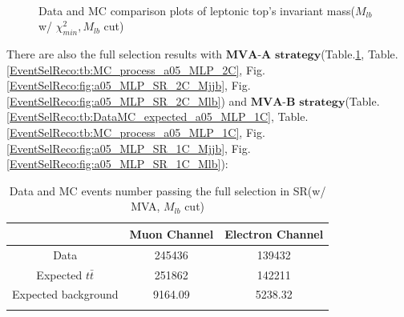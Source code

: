 		\begin{figure}[H]
		\centering
			\\
		\caption{Data and MC comparison plots of leptonic top's invariant mass($M_{lb}$ w/ $\chi^2_{min}, M_{lb}$ cut)}
		\label{EventSelReco:fig:chi2_SR_2C_Mlb}
		\end{figure}
		\FloatBarrier

		There are also the full selection results with $\textbf{MVA-A strategy}$(Table.\ref{EventSelReco:tb:DataMC_expected_a05_MLP_2C}, Table.\ref{EventSelReco:tb:MC_process_a05_MLP_2C}, Fig.\ref{EventSelReco:fig:a05_MLP_SR_2C_Mjjb}, Fig.\ref{EventSelReco:fig:a05_MLP_SR_2C_Mlb}) and $\textbf{MVA-B strategy}$(Table.\ref{EventSelReco:tb:DataMC_expected_a05_MLP_1C}, Table.\ref{EventSelReco:tb:MC_process_a05_MLP_1C}, Fig.\ref{EventSelReco:fig:a05_MLP_SR_1C_Mjjb}, Fig.\ref{EventSelReco:fig:a05_MLP_SR_1C_Mlb}):

		\begin{center}
		\begin{longtable}[H]{ c c c }
		\caption{Data and MC events number passing the full selection in SR(w/ MVA, $M_{lb}$ cut)} \\
		\hline
		 & Muon Channel & Electron Channel \\ 
		\hline
		 Data & 245436 & 139432 \\
		\hline
		 Expected $t\bar{t}$ & 251862 & 142211 \\
		 Expected background & 9164.09 & 5238.32 \\
		\hline
		\label{EventSelReco:tb:DataMC_expected_a05_MLP_2C}
		\end{longtable}
		\end{center}
		\FloatBarrier

